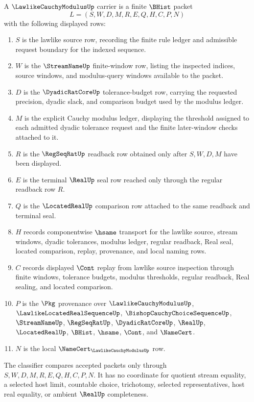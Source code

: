 \begin{definition}
\label{def:lawlike-cauchy-modulus-carrier}
A $\LawlikeCauchyModulusUp$ carrier is a finite $\BHist$ packet
$$
L=(S,W,D,M,R,E,Q,H,C,P,N)
$$
with the following displayed rows:
\begin{enumerate}
\item $S$ is the lawlike source row, recording the finite rule ledger and admissible request boundary for the indexed sequence.
\item $W$ is the $\StreamNameUp$ finite-window row, listing the inspected indices, source windows, and modulus-query windows available to the packet.
\item $D$ is the $\DyadicRatCoreUp$ tolerance-budget row, carrying the requested precision, dyadic slack, and comparison budget used by the modulus ledger.
\item $M$ is the explicit Cauchy modulus ledger, displaying the threshold assigned to each admitted dyadic tolerance request and the finite later-window checks attached to it.
\item $R$ is the $\RegSeqRatUp$ readback row obtained only after $S,W,D,M$ have been displayed.
\item $E$ is the terminal $\RealUp$ seal row reached only through the regular readback row $R$.
\item $Q$ is the $\LocatedRealUp$ comparison row attached to the same readback and terminal seal.
\item $H$ records componentwise $\hsame$ transport for the lawlike source, stream windows, dyadic tolerances, modulus ledger, regular readback, Real seal, located comparison, replay, provenance, and local naming rows.
\item $C$ records displayed $\Cont$ replay from lawlike source inspection through finite windows, tolerance budgets, modulus thresholds, regular readback, Real sealing, and located comparison.
\item $P$ is the $\Pkg$ provenance over $\LawlikeCauchyModulusUp$, $\LawlikeLocatedRealSequenceUp$, $\BishopCauchyChoiceSequenceUp$, $\StreamNameUp$, $\RegSeqRatUp$, $\DyadicRatCoreUp$, $\RealUp$, $\LocatedRealUp$, $\BHist$, $\hsame$, $\Cont$, and $\NameCert$.
\item $N$ is the local $\NameCert_{\LawlikeCauchyModulusUp}$ row.
\end{enumerate}
The classifier compares accepted packets only through $S,W,D,M,R,E,Q,H,C,P,N$. It has no coordinate for quotient stream equality, a selected host limit, countable choice, trichotomy, selected representatives, host real equality, or ambient $\RealUp$ completeness.
\end{definition}

